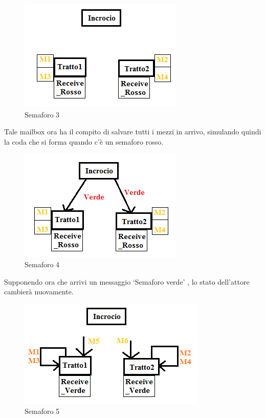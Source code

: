 \documentclass{article}
\begin{document}
\begin{figure}[H]
\begin{center}
\includegraphics{./img/Semaforo3.png}
\caption{Semaforo 3}
\label{fig:Semaforo 3}
\end{center}
\end{figure}
Tale mailbox ora ha il compito di salvare tutti i mezzi in arrivo, simulando quindi la coda che si forma quando c\textquoteright{}\`{e} un semaforo rosso.
\begin{figure}[H]
\begin{center}
\includegraphics{./img/Semaforo4.png}
\caption{Semaforo 4}
\label{fig:Semaforo 4}
\end{center}
\end{figure}
Supponendo ora che arrivi un messaggio \lq Semaforo verde\rq{} , lo stato dell\textquoteright{}attore cambier\`{a} nuovamente.
\begin{figure}[H]
\begin{center}
\includegraphics{./img/Semaforo5.png}
\caption{Semaforo 5}
\label{fig:Semaforo 5}
\end{center}
\end{figure}
\end{document}
